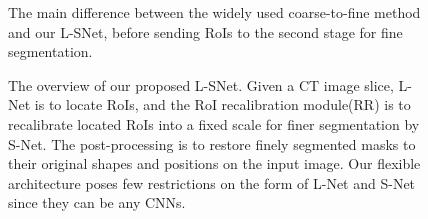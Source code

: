 \documentclass{article}
\begin{document}
\begin{figure}[t]\vspace{-20pt}
    \centering
    \vspace{-10pt}
    \caption{The main difference between the widely used coarse-to-fine method and our L-SNet, before sending RoIs to the second stage for fine segmentation.}
    \label{fig:intro}\vspace{-15pt}
\end{figure}

\begin{figure}[ht]\vspace{-10pt}
    \centering
    \vspace{-10pt}
    \caption{The overview of our proposed L-SNet. Given a CT image slice, L-Net is to locate RoIs, and the RoI recalibration module(RR) is to recalibrate located RoIs into a fixed scale for finer segmentation by S-Net. The post-processing is to restore finely segmented masks to their original shapes and positions on the input image. Our flexible architecture poses few restrictions on the form of L-Net and S-Net since they can be any CNNs.}
    \label{fig:process}\vspace{-10pt}
\end{figure}
\end{document}
